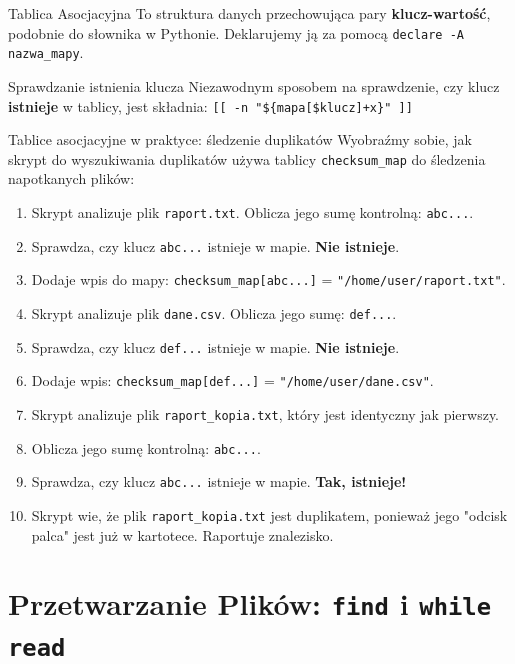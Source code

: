 \begin{definitionbox}{Tablica Asocjacyjna}
To struktura danych przechowująca pary \textbf{klucz-wartość}, podobnie do słownika w Pythonie. Deklarujemy ją za pomocą \texttt{declare -A nazwa\_mapy}.
\end{definitionbox}

\begin{importantbox}{Sprawdzanie istnienia klucza}
Niezawodnym sposobem na sprawdzenie, czy klucz \textbf{istnieje} w tablicy, jest składnia: \texttt{[[ -n "\$\{mapa[\$klucz]+x\}" ]]}
\end{importantbox}

\begin{definitionbox}{Tablice asocjacyjne w praktyce: śledzenie duplikatów}
Wyobraźmy sobie, jak skrypt do wyszukiwania duplikatów używa tablicy \texttt{checksum\_map} do śledzenia napotkanych plików:
\begin{enumerate}
    \item Skrypt analizuje plik \texttt{raport.txt}. Oblicza jego sumę kontrolną: \texttt{abc...}.
    \item Sprawdza, czy klucz \texttt{abc...} istnieje w mapie. \textbf{Nie istnieje}.
    \item Dodaje wpis do mapy: \texttt{checksum\_map[abc...]} = \texttt{"/home/user/raport.txt"}.
    \item Skrypt analizuje plik \texttt{dane.csv}. Oblicza jego sumę: \texttt{def...}.
    \item Sprawdza, czy klucz \texttt{def...} istnieje w mapie. \textbf{Nie istnieje}.
    \item Dodaje wpis: \texttt{checksum\_map[def...]} = \texttt{"/home/user/dane.csv"}.
    \item Skrypt analizuje plik \texttt{raport\_kopia.txt}, który jest identyczny jak pierwszy.
    \item Oblicza jego sumę kontrolną: \texttt{abc...}.
    \item Sprawdza, czy klucz \texttt{abc...} istnieje w mapie. \textbf{Tak, istnieje!}
    \item Skrypt wie, że plik \texttt{raport\_kopia.txt} jest duplikatem, ponieważ jego "odcisk palca" jest już w kartotece. Raportuje znalezisko.
\end{enumerate}
\end{definitionbox}

\section{Przetwarzanie Plików: \texttt{find} i \texttt{while read}}

